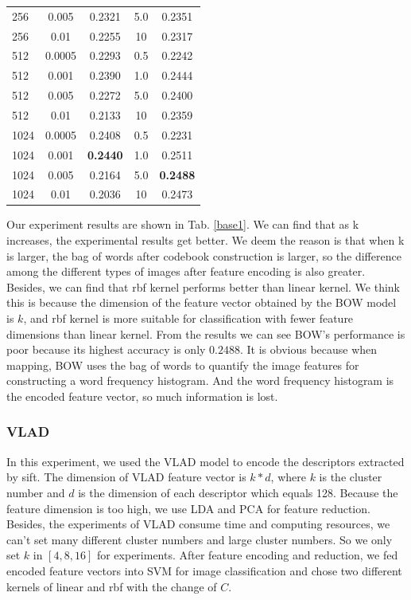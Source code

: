 \documentclass[conference]{IEEEtran}
\begin{document}
\begin{table}[htbp]
\begin{tabular}{@{}p{1cm}<{\centering}|c|c|c|c}
		256   & 0.005  & 0.2321 & 5.0 & 0.2351\\
        256   & 0.01  & 0.2255 & 10 & 0.2317\\
        \hline
		512   & 0.0005  & 0.2293 & 0.5 & 0.2242\\
		512   & 0.001  & 0.2390 & 1.0 & 0.2444\\
		512   & 0.005  & 0.2272 & 5.0 & 0.2400\\
        512   & 0.01  & 0.2133 & 10 & 0.2359\\
        \hline
		1024   & 0.0005  & 0.2408 & 0.5 & 0.2231\\
		1024   & 0.001  & \textbf{0.2440} & 1.0 & 0.2511\\
		1024   & 0.005  & 0.2164 & 5.0 & \textbf{0.2488}\\
		1024   & 0.01  & 0.2036 & 10 & 0.2473\\
		\hline
	\end{tabular}
\end{table}

Our experiment results are shown in Tab. \ref{base1}. We can find that as k increases, the experimental results get better. We deem the reason is that when k is larger, the bag of words after codebook construction is larger, so the difference among the different types of images after feature encoding is also greater. Besides, we can find that rbf kernel performs better than linear kernel. We think this is because the dimension of the feature vector obtained by the BOW model is $k$, and rbf kernel is more suitable for classification with fewer feature dimensions than linear kernel. From the results we can see BOW's performance is poor because its highest accuracy is only $0.2488$. It is obvious because when mapping, BOW uses the  bag of words to quantify the image features for constructing a word frequency histogram. And the word frequency histogram is the encoded feature vector, so much information is lost.
\subsubsection{VLAD}
In this experiment, we used the VLAD model to encode the descriptors extracted by sift. The dimension of VLAD feature vector is $k*d$, where $k$ is the cluster number and $d$ is the dimension of each descriptor which equals 128. Because the feature dimension is too high, we use LDA and PCA for feature reduction. Besides, the experiments of VLAD consume time and computing resources, we can't set many different cluster numbers and large cluster numbers. So we only set $k$ in $[4,8,16]$ for experiments. After feature encoding and reduction, we fed encoded feature vectors into SVM for image classification and chose two different kernels of linear and rbf with the change of $C$.
\end{document}
